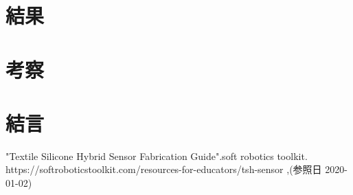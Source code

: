 \section{結果}

\section{考察}

\section{結言}

\small
\begin{thebibliography}{99}
 "Textile Silicone Hybrid Sensor Fabrication \newline Guide".soft robotics toolkit. \newline https://softroboticstoolkit.com/resources-for-educators/tsh-sensor ,(参照日 2020-01-02)
\end{thebibliography}
\normalsize
